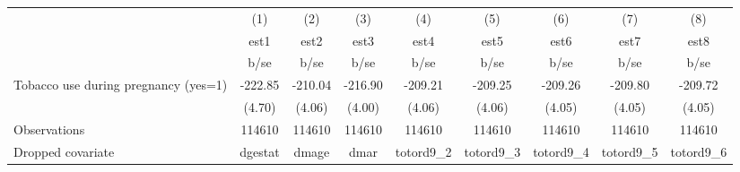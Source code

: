 {
\def\sym#1{\ifmmode^{#1}\else\(^{#1}\)\fi}
\begin{tabular}{l*{8}{c}}
\hline\hline
                                                  &\multicolumn{1}{c}{(1)}&\multicolumn{1}{c}{(2)}&\multicolumn{1}{c}{(3)}&\multicolumn{1}{c}{(4)}&\multicolumn{1}{c}{(5)}&\multicolumn{1}{c}{(6)}&\multicolumn{1}{c}{(7)}&\multicolumn{1}{c}{(8)}\\
                                                  &        est1&        est2&        est3&        est4&        est5&        est6&        est7&        est8\\
                                                  &        b/se&        b/se&        b/se&        b/se&        b/se&        b/se&        b/se&        b/se\\
\hline
Tobacco use during pregnancy (yes=1)              &     -222.85&     -210.04&     -216.90&     -209.21&     -209.25&     -209.26&     -209.80&     -209.72\\
                                                  &      (4.70)&      (4.06)&      (4.00)&      (4.06)&      (4.06)&      (4.05)&      (4.05)&      (4.05)\\
\hline
Observations                                      &      114610&      114610&      114610&      114610&      114610&      114610&      114610&      114610\\
Dropped covariate                                 &     dgestat&       dmage&        dmar&   totord9\_2&   totord9\_3&   totord9\_4&   totord9\_5&   totord9\_6\\
\hline\hline
\end{tabular}
}
